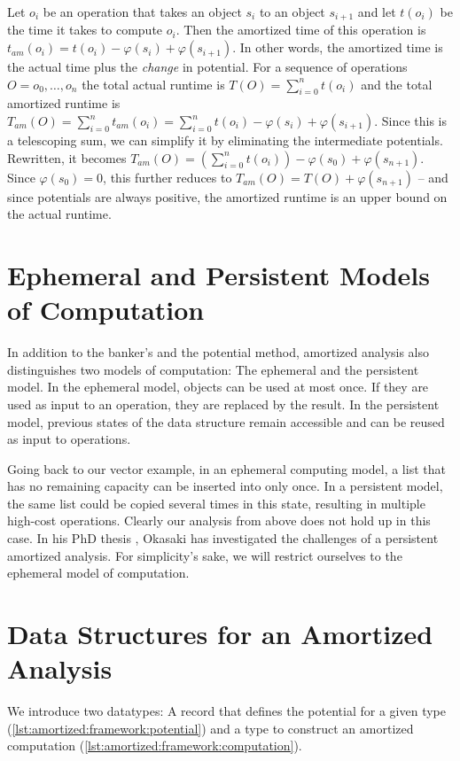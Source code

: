 Let $o_i$ be an operation that takes an object $s_i$ to an object $s_{i+1}$ and let $t(o_i)$ be the time it takes to compute $o_i$. Then the amortized time of this operation is $t_{am}(o_i) = t(o_i) - \varphi(s_i) + \varphi(s_{i+1})$. In other words, the amortized time is the actual time plus the \emph{change} in potential. For a sequence of operations $O = o_0, \ldots, o_n$ the total actual runtime is $T(O) = \sum_{i = 0}^n t(o_i)$ and the total amortized runtime is $T_{am}(O) = \sum_{i = 0}^n t_{am}(o_i) = \sum_{i = 0}^n t(o_i) - \varphi(s_i) + \varphi(s_{i+1})$. Since this is a telescoping sum, we can simplify it by eliminating the intermediate potentials. Rewritten, it becomes $T_{am}(O) = \left(\sum_{i = 0}^n t(o_i)\right) - \varphi(s_0) + \varphi(s_{n+1})$. Since $\varphi(s_0) = 0$, this further reduces to $T_{am}(O) = T(O) + \varphi(s_{n+1})$ -- and since potentials are always positive, the amortized runtime is an upper bound on the actual runtime.

\section{Ephemeral and Persistent Models of Computation}
In addition to the banker's and the potential method, amortized analysis also distinguishes two models of computation: The ephemeral and the persistent model. In the ephemeral model, objects can be used at most once. If they are used as input to an operation, they are replaced by the result. In the persistent model, previous states of the data structure remain accessible and can be reused as input to operations.

Going back to our vector example, in an ephemeral computing model, a list that has no remaining capacity can be inserted into only once. In a persistent model, the same list could be copied several times in this state, resulting in multiple high-cost operations. Clearly our analysis from above does not hold up in this case. In his PhD thesis \cite{okasaki:1998:purelyfunctionaldatastructures}, Okasaki has investigated the challenges of a persistent amortized analysis. For simplicity's sake, we will restrict ourselves to the ephemeral model of computation.

\section{Data Structures for an Amortized Analysis}
We introduce two datatypes: A record that defines the potential for a given type (\autoref{lst:amortized:framework:potential}) and a type to construct an amortized computation (\autoref{lst:amortized:framework:computation}).

